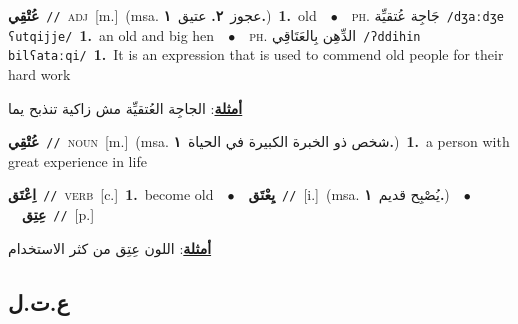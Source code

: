 \documentclass[10pt,a4paper,twoside]{article} %
\begin{document}
\begin{multicols}{2}
{{{{{{{{{{{\setlength\topsep{0pt}\textbf{\foreignlanguage{arabic}{عُتْقِي}}\ {\color{gray}\texttt{//}\color{black}}\ \textsc{adj}\ [m.]\ \color{gray}(msa. \foreignlanguage{arabic}{عجوز}~\foreignlanguage{arabic}{\textbf{٢.}}  \foreignlanguage{arabic}{عتيق}~\foreignlanguage{arabic}{\textbf{١.}})\color{black}\ \textbf{1.}~old\ \ $\bullet$\ \ \textsc{ph.} \color{gray} \foreignlanguage{arabic}{جَاجِة عُتقيِّة}\color{black}\ {\color{gray}\texttt{/{\sffamily dʒaːdʒe ʕutqijje}/}\color{black}}\ \textbf{1.}~an old and big hen\ \ $\bullet$\ \ \textsc{ph.} \color{gray} \foreignlanguage{arabic}{الدِّهِن بِالعَتَاقِي}\color{black}\ {\color{gray}\texttt{/{\sffamily ʔddihin bilʕataːqi}/}\color{black}}\ \textbf{1.}~It is an expression that is used to commend old people for their hard work\  \begin{flushright}\color{gray}\foreignlanguage{arabic}{\textbf{\underline{\foreignlanguage{arabic}{أمثلة}}}: الجاجِة العُتقيِّة مش زاكية تنذبح يما}\end{flushright}\color{black}} \vspace{2mm}

{\setlength\topsep{0pt}\textbf{\foreignlanguage{arabic}{عُتْقِي}}\ {\color{gray}\texttt{//}\color{black}}\ \textsc{noun}\ [m.]\ \color{gray}(msa. \foreignlanguage{arabic}{شخص ذو الخبرة الكبيرة في الحياة}~\foreignlanguage{arabic}{\textbf{١.}})\color{black}\ \textbf{1.}~a person with great experience in life\ 

{\setlength\topsep{0pt}\textbf{\foreignlanguage{arabic}{اِعْتَق}}\ {\color{gray}\texttt{//}\color{black}}\ \textsc{verb}\ [c.]\ \textbf{1.}~become old\ \ $\bullet$\ \ \setlength\topsep{0pt}\textbf{\foreignlanguage{arabic}{يِعْتَق}}\ {\color{gray}\texttt{//}\color{black}}\ [i.]\ \color{gray}(msa. \foreignlanguage{arabic}{يُصْبِح قديم}~\foreignlanguage{arabic}{\textbf{١.}})\color{black}\ \ $\bullet$\ \ \setlength\topsep{0pt}\textbf{\foreignlanguage{arabic}{عِتِق}}\ {\color{gray}\texttt{//}\color{black}}\ [p.]\  \begin{flushright}\color{gray}\foreignlanguage{arabic}{\textbf{\underline{\foreignlanguage{arabic}{أمثلة}}}: اللون عِتِق من كثر الاستخدام}\end{flushright}\color{black}} \vspace{2mm}

\vspace{-3mm}
\subsection*{\color{blue}\foreignlanguage{arabic}{ع.ت.ل}\color{blue}{}} 

}}}}}}}}}}}
\end{multicols}
\end{document}
